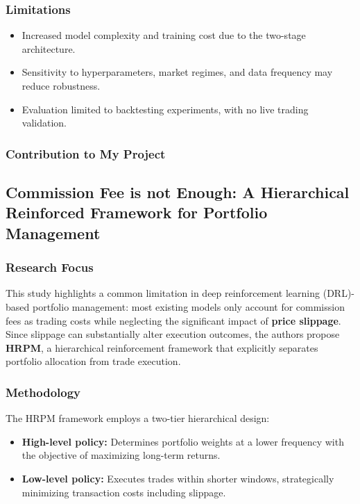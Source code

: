 \documentclass[12pt,a4paper]{report}
\begin{document}
\subsubsection{Limitations}
\begin{itemize}
    \item Increased model complexity and training cost due to the two-stage architecture.  
    \item Sensitivity to hyperparameters, market regimes, and data frequency may reduce robustness.  
    \item Evaluation limited to backtesting experiments, with no live trading validation.  
\end{itemize}

\subsubsection{Contribution to My Project}


\subsection{Commission Fee is not Enough: A Hierarchical Reinforced Framework for Portfolio Management \cite{wang2021commission}}

\subsubsection{Research Focus}
This study highlights a common limitation in deep reinforcement learning (DRL)-based portfolio management: most existing models only account for commission fees as trading costs while neglecting the significant impact of \textbf{price slippage}. Since slippage can substantially alter execution outcomes, the authors propose \textbf{HRPM}, a hierarchical reinforcement framework that explicitly separates portfolio allocation from trade execution.

\subsubsection{Methodology}
The HRPM framework employs a two-tier hierarchical design:
\begin{itemize}
    \item \textbf{High-level policy:} Determines portfolio weights at a lower frequency with the objective of maximizing long-term returns.  
    \item \textbf{Low-level policy:} Executes trades within shorter windows, strategically minimizing transaction costs including slippage.  
\end{itemize}
\end{document}
